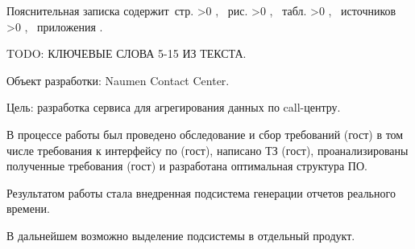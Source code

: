 \Referat

Пояснительная записка содержит \pageref{LastPage}\,стр.%
\ifnum \totfig >0
, \totfig~рис.%
\fi
\ifnum \tottab >0
, \tottab~табл.%
\fi
%
\ifnum \totbib >0
, \totbib~источников%
\fi
%
\ifnum \totapp >0
, \totapp~приложения%
\else
.%
\fi

TODO: КЛЮЧЕВЫЕ СЛОВА 5-15 ИЗ ТЕКСТА.

Объект разработки: Naumen Contact Center.

Цель: разработка сервиса для агрегирования данных по call-центру.

В процессе работы был проведено обследование и сбор требований (гост) в том числе требования к интерфейсу по (гост),
написано ТЗ (гост), проанализированы полученные требования (гост) и разработана оптимальная структура ПО.

Результатом работы стала внедренная подсистема генерации отчетов реального времени.

В дальнейшем возможно выделение подсистемы в отдельный продукт.